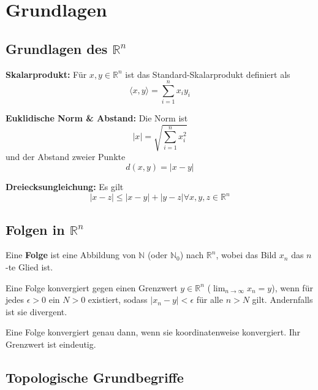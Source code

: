 \section{Grundlagen}

\subsection{Grundlagen des $\mathbb{R}^n$}

\begin{definition}
    \textbf{Skalarprodukt:} Für $x, y \in \mathbb{R}^n$ ist das Standard-Skalarprodukt definiert als 
    $$\langle x, y \rangle = \sum_{i=1}^{n} x_i y_i$$
\end{definition}

\begin{definition}
    \textbf{Euklidische Norm \& Abstand:} Die Norm ist 
    $$|x| = \sqrt{\sum_{i=1}^{n} x_i^2}$$
    und der Abstand zweier Punkte 
    $$d(x,y) = |x-y|$$
\end{definition}

\begin{theorem}
    \textbf{Dreiecksungleichung:} Es gilt 
    $$|x-z| \le |x-y| + |y-z| \forall x, y, z \in \mathbb{R}^n$$
\end{theorem}

\subsection{Folgen in $\mathbb{R}^n$}

\begin{definition}
    Eine \textbf{Folge} ist eine Abbildung von $\mathbb{N}$ (oder $\mathbb{N}_0$) nach $\mathbb{R}^n$, wobei das Bild $x_n$ das $n$-te Glied ist.
\end{definition}

\begin{theorem}
    Eine Folge konvergiert gegen einen Grenzwert $y \in \mathbb{R}^n$ ($\lim_{n\to\infty} x_n = y$), wenn für jedes $\epsilon > 0$ ein $N > 0$ existiert, sodass $|x_n - y| < \epsilon$ für alle $n > N$ gilt. Andernfalls ist sie divergent.
\end{theorem}

\begin{lemma}
    Eine Folge konvergiert genau dann, wenn sie koordinatenweise konvergiert. Ihr Grenzwert ist eindeutig.
\end{lemma}

\subsection{Topologische Grundbegriffe}

